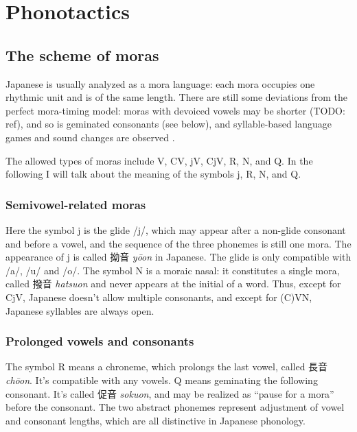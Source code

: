 \documentclass[UTF8, a4paper, oneside, scheme=plain]{ctexrep}
\newcommand*{\citesec}[1]{\S~{#1}}
\newcommand{\corpus}[1]{\emph{#1}}
\begin{document}
\section{Phonotactics}

\subsection{The scheme of moras}\label{sec:mora-scheme}

Japanese is usually analyzed as a mora language:
each mora occupies one rhythmic unit and is of the same length.
There are still some deviations from the perfect mora-timing model:
moras with devoiced vowels may be shorter (TODO: ref),
and so is geminated consonants (see below),
and syllable-based language games and sound changes are observed 
\citep[\citesec{3.3}]{tsujimura2013introduction}.

The allowed types of moras include V, CV, jV, CjV, R, N, and Q.
In the following I will talk about the meaning of the symbols j, R, N, and Q. 

\subsubsection{Semivowel-related moras}

Here the symbol j is the glide /j/,
which may appear after a non-glide consonant and before a vowel,
and the sequence of the three phonemes is still one mora.
The appearance of j is called 拗音 \corpus{yōon} in Japanese.
The glide is only compatible with /a/, /u/ and /o/.
The symbol N is a moraic nasal:
it constitutes a single mora, called 撥音 \corpus{hatsuon} 
and never appears at the initial of a word.
Thus, except for CjV, Japanese doesn't allow multiple consonants,
and except for (C)VN, Japanese syllables are always open.

\subsubsection{Prolonged vowels and consonants}

The symbol R means a chroneme,
which prolongs the last vowel,
called 長音 \corpus{chōon}.
It's compatible with any vowels.
Q means geminating the following consonant.
It's called 促音 \corpus{sokuon},
and may be realized as ``pause for a mora'' before the consonant. 
The two abstract phonemes represent adjustment of vowel and consonant lengths,
which are all distinctive in Japanese phonology.
\end{document}
